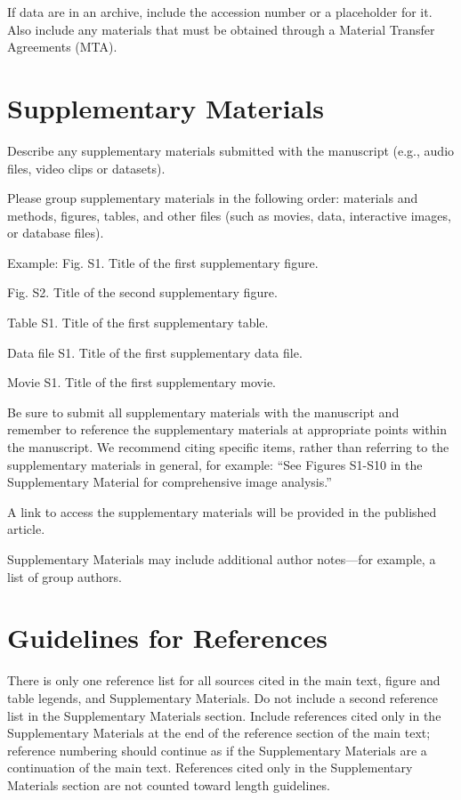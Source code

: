\documentclass{article}
\begin{document}
If data are in an archive, include the accession number or a placeholder for it. Also include any materials that must be obtained through a Material Transfer Agreements (MTA).

\section*{Supplementary Materials}
Describe any supplementary materials submitted with the manuscript (e.g., audio files, video clips or datasets).

Please group supplementary materials in the following order: materials and methods, figures, tables, and other files (such as movies, data, interactive images, or database files).

\medskip Example:
Fig. S1. Title of the first supplementary figure.

Fig. S2. Title of the second supplementary figure.

Table S1. Title of the first supplementary table.

Data file S1. Title of the first supplementary data file.

Movie S1. Title of the first supplementary movie.

\medskip
Be sure to submit all supplementary materials with the manuscript and remember to reference the supplementary materials at appropriate points within the manuscript. We recommend citing specific items, rather than referring to the supplementary materials in general, for example: ``See Figures S1-S10 in the Supplementary Material for comprehensive image analysis.''

A link to access the supplementary materials will be provided in the published article.

Supplementary Materials may include additional author notes—for example, a list of group authors.

\section*{Guidelines for References}

There is only one reference list for all sources cited in the main text, figure and table legends, and Supplementary Materials. Do not include a second reference list in the Supplementary Materials section. Include references cited only in the Supplementary Materials at the end of the reference section of the main text; reference numbering should continue as if the Supplementary Materials are a continuation of the main text. References cited only in the Supplementary Materials section are not counted toward length guidelines.
\end{document}
